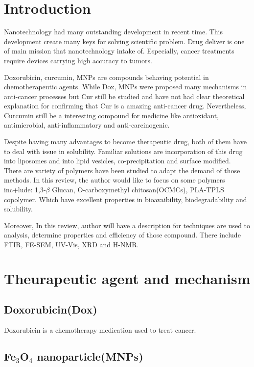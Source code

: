 \documentclass[10pt,a4paper]{article}
\begin{document}
\begin{multicols}{2}
\section{Introduction}

Nanotechnology had many outstanding development in recent time. This development create many keys for solving scientific problem. Drug deliver is one of main mission that nanotechnology intake of. Especially, cancer treatments require devices carrying high accuracy to tumors.

Doxorubicin, curcumin, MNPs are compounds behaving potential in chemotherapeutic agents. While Dox, MNPs were proposed many mechanisms in anti-cancer processes but Cur still be studied and have not had clear theoretical explanation for confirming that Cur is a amazing anti-cancer drug. Nevertheless, Curcumin still be a interesting compound for medicine like antioxidant, antimicrobial, anti-inflammatory and anti-carcinogenic.

Despite having many advantages to become therapeutic drug, both of them have to deal with issue in solubility. Familiar solutions are incorporation of this drug into liposomes and into lipid vesicles, co-precipitation and surface modified. There are variety of polymers have been studied to adapt the demand of those methods. In this review, the author would like to focus on some polymers inc+lude: 1,3-$\beta$ Glucan, O-carboxymethyl chitosan(OCMCs), PLA-TPLS copolymer. Which have excellent properties in bioavaibility, biodegradability and solubility.

Moreover, In this review, author will have a description for techniques are used to analysis, determine properties and efficiency of those compound. There include FTIR, FE-SEM, UV-Vis, XRD and H-NMR.

\section{Theurapeutic agent and mechanism}
\subsection{Doxorubicin(Dox)}

Doxorubicin is a chemotherapy medication used to treat cancer.  
\subsection{Fe$_3$O$_4$ nanoparticle(MNPs)}


\end{multicols}
\end{document}
